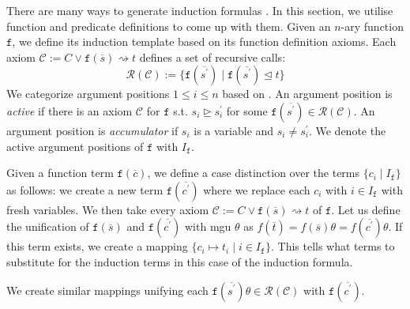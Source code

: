 
There are many ways to generate induction formulas \cite{aclhandbook,bundychapter,cruanes,hipspec,hipster,isaplanner,computing}. In this section, we utilise function and predicate definitions to come up with them. Given an $n$-ary function $\mathtt{f}$, we define its induction template based on its function definition axioms. Each axiom $\mathcal{C}:=C\lor \mathtt{f}(\overline{s}) \rightsquigarrow t$ defines a set of recursive calls:
$$\mathcal{R}(\mathcal{C}):=\{\mathtt{f}(\overline{s^\prime})\mid \mathtt{f}(\overline{s^\prime})\trianglelefteq t\}$$
We categorize argument positions $1\le i\le n$ based on \cite{cruanes}. An argument position is \textit{active} if there is an axiom $\mathcal{C}$ for $\mathtt{f}$ s.t. $s_i \trianglerighteq s^\prime_i$ for some $\mathtt{f}(\overline{s^\prime})\in\mathcal{R}(\mathcal{C})$. An argument position is \textit{accumulator} if $s_i$ is a variable and $s_i\neq s^\prime_i$. We denote the active argument positions of $\mathtt{f}$ with $I_\mathtt{f}$.


Given a function term $\mathtt{f}(\overline{c})$, we define a case distinction over the terms $\{c_i\mid I_\mathtt{f}\}$ as follows: we create a new term $\mathtt{f}(\overline{c^\prime})$ where we replace each $c_i$ with $i\in I_\mathtt{f}$ with fresh variables. We then take every axiom $\mathcal{C}:=C\lor \mathtt{f}(\overline{s}) \rightsquigarrow t$ of $\mathtt{f}$. Let us define the unification of $\mathtt{f}(\overline{s})$ and $\mathtt{f}(\overline{c^\prime})$ with mgu $\theta$ as $f(\overline{t})=f(\overline{s})\theta=f(\overline{c^\prime})\theta$. If this term exists, we create a mapping $\{c_i\mapsto t_i\mid i\in I_\mathtt{f}\}$. This tells what terms to substitute for the induction terms in this case of the induction formula.

We create similar mappings unifying each $\mathtt{f}(\overline{s^\prime})\theta\in\mathcal{R}(\mathcal{C})$ with $\mathtt{f}(\overline{c^\prime})$.

